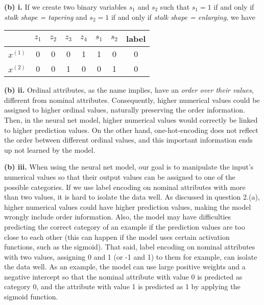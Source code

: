 \documentclass[leqno]{article}
\begin{document}
\hfill

\noindent \textbf{(b) i.} If we create two binary variables $s_1$ and $s_2$ such that $s_1 = 1$ if and only if \textit{stalk shape = tapering} and 
$s_2 = 1$ if and only if \textit{stalk shape = enlarging}, we have
\begin{center}
\begin{tabular}{ |c|c|c|c|c|c|c|c| } 
 \hline
 & $z_1$ & $z_2$ & $z_3$ & $z_4$ & $s_1$ & $s_2$ & label \\ \hline
 $x^{(1)}$ & 0 & 0 & 0 & 1 & 1 & 0 & 0 \\ 
 $x^{(2)}$ & 0 & 0 & 1 & 0 & 0 & 1 & 0 \\
 \hline
\end{tabular}
\end{center}

\hfill

\noindent \textbf{(b) ii.} Ordinal attributes, as the name implies, have an \textit{order over their values}, different from nominal attributes. 
Consequently, higher numerical values could be assigned to higher ordinal values, naturally preserving the order information. Then, in the neural net model, 
 higher numerical values would correctly be linked to higher prediction values. On the other hand, one-hot-encoding does not reflect the order between different 
ordinal values, and this important information ends up not learned by the model. 

\hfill 

\noindent \textbf{(b) iii.} When using the neural net model, our goal is to manipulate the input's numerical values so that their output values can be assigned 
to one of the possible categories. If we use label encoding on nominal attributes with more than two values, it is hard to isolate the data well. As discussed in 
 question 2.(a), higher numerical values could have higher prediction values, making the model wrongly include order information. Also, 
the model may have difficulties predicting the correct category of an example if the prediction values are too close to each other (this can 
happen if the model uses certain activation functions, such as the sigmoid). That said, label encoding on nominal attributes with two values, assigning 0 and 1 
(or -1 and 1) to them for example, can isolate the data well. As an example, the model can use large positive weights and a negative intercept so that the  
nominal attribute with value 0 is predicted as category 0, and the attribute with value 1 is predicted as 1 by applying the sigmoid function.
\end{document}
